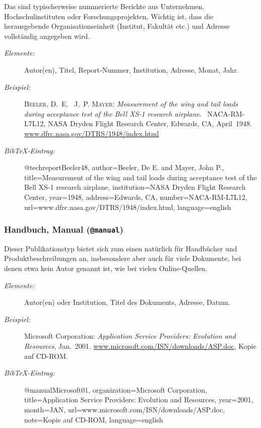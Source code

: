 Das sind typischerweise nummerierte Berichte aus Unternehmen, Hochschulinstituten oder Forschungsprojekten, 
Wichtig ist, dass die herausgebende Organisationseinheit (Institut, Fakultät etc.) und 
Adresse vollständig angegeben wird.
%
\begin{description}
\item[\it Elemente:] \hfill\break
  Autor(en), Titel, Report-Nummer, Institution, Adresse, Monat, Jahr.
\item[\it Beispiel:] \hfill\break
\textsc{Beeler, D.~E.} \ \textsc{J.~P. Mayer}: \emph{Measurement of the
  wing and tail loads during acceptance test of the {Bell} {XS-1} research
  airplane}.
  \newblock {}\ NACA-RM-L7L12, NASA Dryden Flight Research
  Center, Edwards, CA, April\ 1948. \url{www.dfrc.nasa.gov/DTRS/1948/index.html}
\item[\it BibTeX-Eintrag:] \mbox{}\par
%
\begin{GenericCode}
@techreport{Beeler48,
  author={Beeler, De E. and Mayer, John P.},
  title={Measurement of the wing and tail loads 
         during acceptance test of the {Bell} 
         {XS-1} research airplane},
  institution={NASA Dryden Flight Research Center},
  year={1948},
  address={Edwards, CA},
  number={NACA-RM-L7L12},
  url={www.dfrc.nasa.gov/DTRS/1948/index.html},
  language={english}
}
\end{GenericCode}
\end{description}

\subsubsection{Handbuch, Manual (\texttt{@manual})}

Dieser Publikationstyp bietet sich zum einen natürlich für Handbücher und Produktbeschreibungen an, insbesondere aber auch für viele Dokumente, bei denen etwa kein Autor genannt ist, wie bei vielen Online-Quellen.

\begin{description}
\item[\it Elemente:] \hfill\break
  Autor(en) oder Institution, Titel des Dokuments, Adresse, Datum.
\item[\it Beispiel:] \hfill\break
{\sc Microsoft Corporation}: {\em Application Service Providers: Evolution
  and Resources\/}, Jan.\ 2001.
\newblock \url{www.microsoft.com/ISN/downloads/ASP.doc}, Kopie auf CD-ROM.
\item[\it BibTeX-Eintrag:] \mbox{}\par
%
\begin{GenericCode}
@manual{Microsoft01,
  organization={Microsoft Corporation},
  title={Application Service Providers: Evolution and Resources},
  year={2001},
  month=JAN,
  url={www.microsoft.com/ISN/downloads/ASP.doc}, 
  note={Kopie auf CD-ROM},
  language={english}
}
\end{GenericCode}
\end{description}


